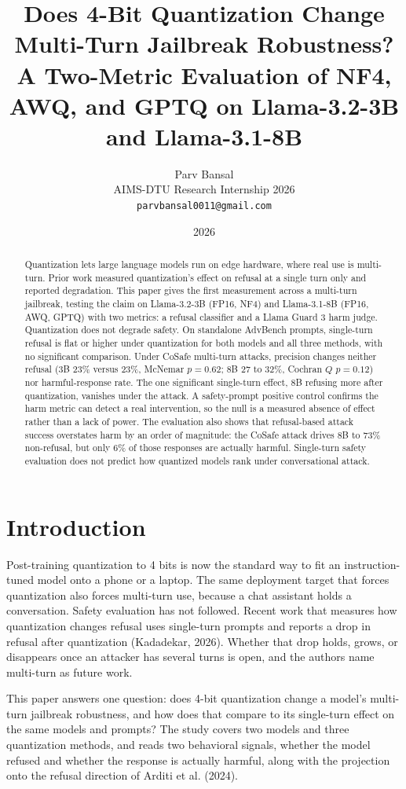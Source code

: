 \documentclass[11pt]{article}
\title{\vspace{-1.5em}\textbf{Does 4-Bit Quantization Change Multi-Turn Jailbreak Robustness?}\\[0.3em]
\large A Two-Metric Evaluation of NF4, AWQ, and GPTQ on Llama-3.2-3B and Llama-3.1-8B}
\author{Parv Bansal\\ AIMS-DTU Research Internship 2026\\ \texttt{parvbansal0011@gmail.com}}
\date{2026}
\begin{document}
\maketitle

\begin{abstract}
\noindent
Quantization lets large language models run on edge hardware, where real use is
multi-turn. Prior work measured quantization's effect on refusal at a single turn
only and reported degradation. This paper gives the first measurement across a
multi-turn jailbreak, testing the claim on Llama-3.2-3B (FP16, NF4) and
Llama-3.1-8B (FP16, AWQ, GPTQ) with two metrics: a refusal classifier and a
Llama Guard 3 harm judge. Quantization does not degrade safety. On standalone
AdvBench prompts, single-turn refusal is flat or higher under quantization for
both models and all three methods, with no significant comparison. Under CoSafe
multi-turn attacks, precision changes neither refusal (3B 23\% versus 23\%,
McNemar $p=0.62$; 8B 27 to 32\%, Cochran $Q$ $p=0.12$) nor harmful-response rate.
The one significant single-turn effect, 8B refusing more after quantization,
vanishes under the attack. A safety-prompt positive control confirms the harm
metric can detect a real intervention, so the null is a measured absence of
effect rather than a lack of power. The evaluation also shows that refusal-based
attack success overstates harm by an order of magnitude: the CoSafe attack drives
8B to 73\% non-refusal, but only 6\% of those responses are actually harmful.
Single-turn safety evaluation does not predict how quantized models rank under
conversational attack.
\end{abstract}

\section{Introduction}

Post-training quantization to 4 bits is now the standard way to fit an
instruction-tuned model onto a phone or a laptop. The same deployment target that
forces quantization also forces multi-turn use, because a chat assistant holds a
conversation. Safety evaluation has not followed. Recent work that measures how
quantization changes refusal uses single-turn prompts and reports a drop in
refusal after quantization (Kadadekar, 2026). Whether that drop holds, grows, or
disappears once an attacker has several turns is open, and the authors name
multi-turn as future work.

This paper answers one question: does 4-bit quantization change a model's
multi-turn jailbreak robustness, and how does that compare to its single-turn
effect on the same models and prompts? The study covers two models and three
quantization methods, and reads two behavioral signals, whether the model refused
and whether the response is actually harmful, along with the projection onto the
refusal direction of Arditi et al. (2024).
\end{document}
